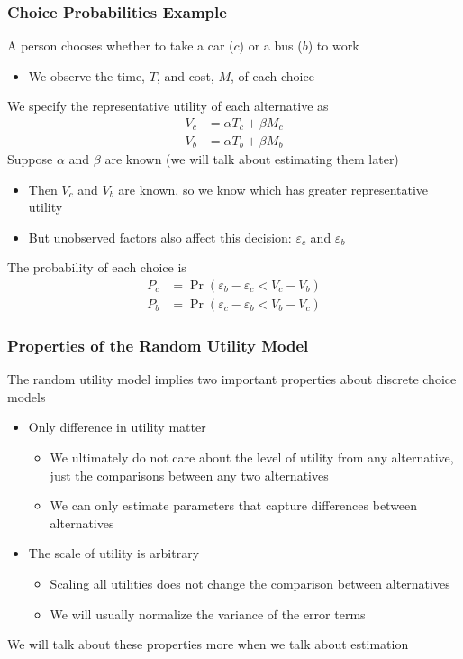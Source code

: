 \documentclass{beamer}
\begin{document}
\begin{frame}\frametitle{Choice Probabilities Example}
    A person chooses whether to take a car ($c$) or a bus ($b$) to work
    \begin{itemize}
    	\item We observe the time, $T$, and cost, $M$, of each choice
    \end{itemize}
    \vspace{1ex}
    We specify the representative utility of each alternative as
    \begin{align*}
    	V_c &= \alpha T_c + \beta M_c \\
    	V_b &= \alpha T_b + \beta M_b
    \end{align*}
    Suppose $\alpha$ and $\beta$ are known (we will talk about estimating them later)
    \begin{itemize}
    	\item Then $V_c$ and $V_b$ are known, so we know which has greater representative utility
    	\item But unobserved factors also affect this decision: $\varepsilon_c$ and $\varepsilon_b$
    \end{itemize}
    \vspace{2ex}
    The probability of each choice is
    \begin{align*}
    	P_c &= \Pr(\varepsilon_b - \varepsilon_c < V_c - V_b) \\
    	P_b &= \Pr(\varepsilon_c - \varepsilon_b < V_b - V_c)
    \end{align*}
\end{frame}

\begin{frame}\frametitle{Properties of the Random Utility Model}
    The random utility model implies two important properties about discrete choice models
    \begin{itemize}
    	\item Only difference in utility matter
    	\begin{itemize}
    		\item We ultimately do not care about the level of utility from any alternative, just the comparisons between any two alternatives
    		\item We can only estimate parameters that capture differences between alternatives
    	\end{itemize}
    	\item The scale of utility is arbitrary
    	\begin{itemize}
    		\item Scaling all utilities does not change the comparison between alternatives
    		\item We will usually normalize the variance of the error terms 
    	\end{itemize}
    \end{itemize}
    \vspace{3ex}
    We will talk about these properties more when we talk about estimation
\end{frame}
\end{document}

